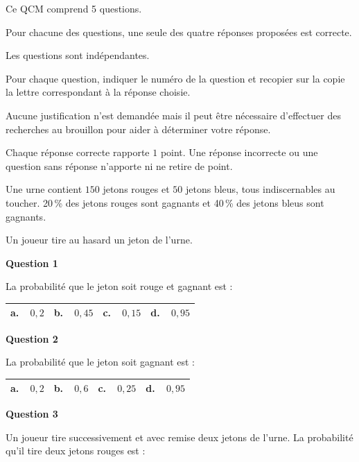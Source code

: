 \medskip

Ce QCM comprend 5 questions. 

Pour chacune des questions, une seule des quatre réponses proposées est correcte. 

Les questions sont indépendantes.

Pour chaque question, indiquer le numéro de la question et recopier sur la copie la lettre correspondant à la réponse choisie. 

Aucune justification n'est demandée mais il peut être nécessaire d'effectuer des recherches au brouillon pour aider à déterminer votre réponse.

Chaque réponse correcte rapporte $1$ point. Une réponse incorrecte ou une question sans réponse n'apporte ni ne retire de point.

\bigskip

Une urne contient $150$ jetons rouges et $50$ jetons bleus, tous indiscernables au toucher. 20\,\% des jetons rouges sont gagnants et 40\,\% des jetons bleus sont gagnants.

 Un joueur tire au hasard un jeton de l'urne.

\medskip

\textbf{Question 1}

\medskip

La probabilité que le jeton soit rouge et gagnant est :

\begin{center}
\begin{tabularx}{\linewidth}{|*{4}{X|}}\hline
\textbf{a.~~}$0,2$&\textbf{b.~~}$0,45$&\textbf{c.~~}$0,15$&\textbf{d.~~}$0,95$\\ \hline
\end{tabularx}
\end{center}

\textbf{Question 2}

\medskip

La probabilité que le jeton soit gagnant est :

\begin{center}
\begin{tabularx}{\linewidth}{|*{4}{X|}}\hline
\textbf{a.~~}$0,2$&\textbf{b.~~}$0,6$&\textbf{c.~~}$0,25$&\textbf{d.~~}$0,95$\\ \hline
\end{tabularx}
\end{center}

\textbf{Question 3}

\medskip

Un joueur tire successivement et avec remise deux jetons de l'urne. La probabilité
qu'il tire deux jetons rouges est :

